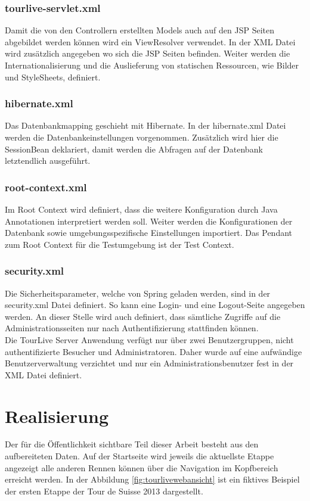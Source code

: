 \subsubsection{tourlive-servlet.xml}
Damit die von den Controllern erstellten Models auch auf den JSP Seiten abgebildet werden können wird ein ViewResolver verwendet. In der XML Datei wird zusätzlich angegeben wo sich die JSP Seiten befinden. Weiter werden die Internationalisierung und die Auslieferung von statischen Ressourcen, wie Bilder und StyleSheets, definiert.

\subsubsection{hibernate.xml}
Das Datenbankmapping geschieht mit Hibernate. In der hibernate.xml Datei werden die Datenbankeinstellungen vorgenommen. Zusätzlich wird hier die SessionBean deklariert, damit werden die Abfragen auf der Datenbank letztendlich ausgeführt.

\subsubsection{root-context.xml}
Im Root Context wird definiert, dass die weitere Konfiguration durch Java Annotationen interpretiert werden soll. Weiter werden die Konfigurationen der Datenbank sowie umgebungsspezifische Einstellungen importiert. Das Pendant zum Root Context für die Testumgebung ist der Test Context.

\subsubsection{security.xml}
Die Sicherheitsparameter, welche von Spring geladen werden, sind in der security.xml Datei definiert. So kann eine Login- und eine Logout-Seite angegeben werden. An dieser Stelle wird auch definiert, dass sämtliche Zugriffe auf die Administrationsseiten nur nach Authentifizierung stattfinden können.
\\

Die TourLive Server Anwendung verfügt nur über zwei Benutzergruppen, nicht authentifizierte Besucher und Administratoren. Daher wurde auf eine aufwändige Benutzerverwaltung verzichtet und nur ein Administrationsbenutzer fest in der XML Datei definiert.

\section{Realisierung}
Der für die Öffentlichkeit sichtbare Teil dieser Arbeit besteht aus den aufbereiteten Daten. Auf der Startseite wird jeweils die aktuellste Etappe angezeigt alle anderen Rennen können über die Navigation im Kopfbereich erreicht werden. In der Abbildung \ref{fig:tourlivewebansicht} ist ein fiktives Beispiel der ersten Etappe der Tour de Suisse 2013 dargestellt.

